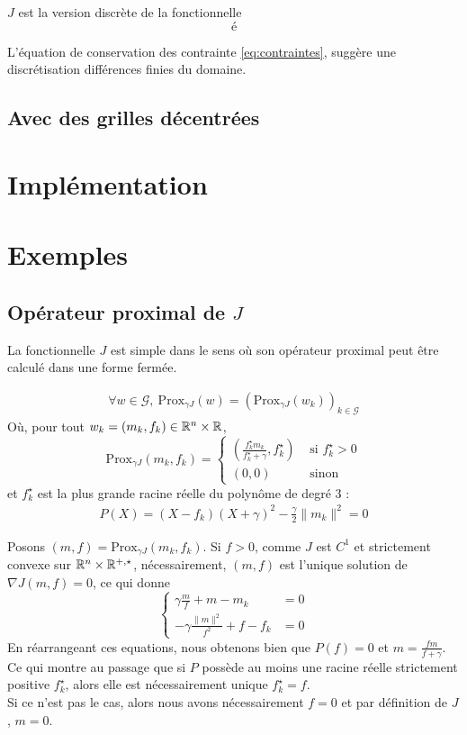 \documentclass[a4paper,12pt]{article}
\newcommand{\prox}{\text{Prox}}
\begin{document}
$J$ est la version discrète de la fonctionnelle
$$
é
$$


L'équation de conservation des contrainte \eqref{eq:contraintes}, suggère une discrétisation différences finies du domaine. 



\subsection{Avec des grilles décentrées}
\section{Implémentation}

\section{Exemples}

\subsection{Opérateur proximal de $J$}
La fonctionnelle $J$ est simple dans le sens où son opérateur proximal peut être calculé dans une forme fermée. 
\begin{proposition}
\begin{align*}
\forall w\in\mathcal{G},\ \prox_{\gamma J}(w) = \left( \prox_{\gamma J}(w_k)\right)_{k\in\mathcal{G}}
\end{align*}
Où, pour tout $w_k=(m_k,f_k)\in\mathbb{R}^n\times\mathbb{R}$, 
$$
\prox_{\gamma J}(m_k,f_k) =\left\{
\begin{array}{cl}
\left(\frac{f^{\star}_k m_k}{f^{\star}_k+\gamma} ,f^{\star}_k\right) & \text{ si } f^{\star}_k >0\\
(0,0) & \text{ sinon }
\end{array}\right.
$$
et $f^{\star}_k$ est la plus grande racine réelle du polynôme de degré 3 : 
\begin{align}
P(X) = (X-f_k)(X+\gamma)^2 -\frac{\gamma}{2}\|m_k\|^2=0
\end{align}
\end{proposition}
\begin{preuve}
Posons $(m,f)=\prox_{\gamma J}(m_k,f_k)$. Si $f>0$, comme $J$ est $C^1$ et strictement convexe sur $\mathbb{R}^n\times\mathbb{R}^{+,\star}$, nécessairement, $(m,f)$ est l'unique solution de $\nabla J(m,f)=0$, ce qui donne 
$$
\left\{
\begin{array}{cc}
\gamma \frac{m}{f}+m-m_k &= 0\\
-\gamma \frac{\|m\|^2}{f^2} + f-f_k &= 0
\end{array}
\right.
$$
En réarrangeant ces equations, nous obtenons bien que $P(f) = 0$ et $m=\frac{f m}{f+\gamma}$. Ce qui montre au passage que si $P$ possède au moins une racine réelle strictement positive $f^{\star}_k$, alors elle est nécessairement unique $f^{\star}_k =f $. \\
Si ce n'est pas le cas, alors nous avons nécessairement $f= 0$ et par définition de $J$, $m=0$.
\end{preuve}
\newpage
\end{document}
